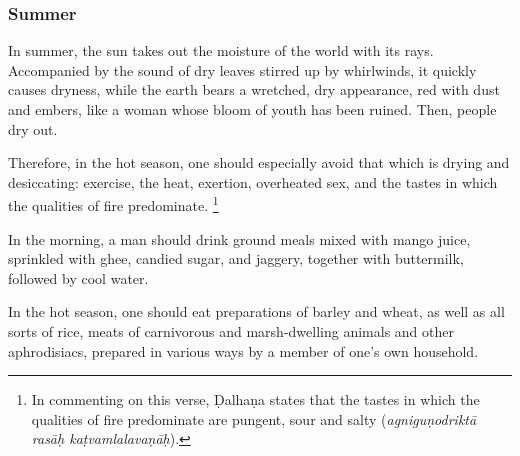 \begin{translation}
\subsubsection{Summer}%

\item[49-50]
In summer, %
the sun takes out %
the moisture of the world %
with its rays. %
Accompanied by the sound of dry leaves stirred up %
by whirlwinds, %
it quickly causes dryness, %
while the earth bears %
a wretched, dry appearance, red with dust and embers, %
like a woman whose bloom of youth has been ruined. %
Then, people dry out. %


\item[51]
Therefore, in the hot season, one should especially avoid that which is drying and desiccating: %
exercise, the heat, exertion, overheated sex, %
and the tastes in which the qualities of fire predominate.%
    \footnote{In commenting on this verse, Ḍalhaṇa states that the tastes in which the qualities of fire predominate are pungent, sour and salty (\emph{agniguṇodriktā rasāḥ kaṭvamlalavaṇāḥ}).}

\item[52]
In the morning, a man should drink ground meals  %
mixed with mango juice, %
sprinkled with %
ghee, candied sugar, %
and jaggery, %
together with buttermilk, %
followed by cool water. %

\item[53]
In the hot season, %
one should eat preparations %
of barley and wheat, as well as all sorts of rice, %
meats of carnivorous and marsh-dwelling animals %
and other aphrodisiacs, %
prepared in various ways %
by a member of one's own household. %


\end{translation}
